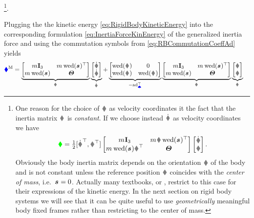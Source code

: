 \footnote{
One reason for the choice of $\v$ as velocity coordinates it the fact that the inertia matrix $\bodyInertiaMat{}{}$ is \textit{constant}.
If we choose instead $\rd$ as velocity coordinates we have
\begin{align*}
 \kineticEnergy = \tfrac{1}{2} [\rd^\top, \w^\top] \begin{bmatrix} \bodyMass{}{} \idMat[3] & \bodyMass{}{} \R \wedOp(\bodyCOM{}{})^\top \\ \bodyMass{}{} \wedOp(\bodyCOM{}{}) \R^\top & \bodyMOI{}{} \end{bmatrix} \begin{bmatrix} \rd \\ \w \end{bmatrix}.
\end{align*}
Obviously the body inertia matrix depends on the orientation $\R$ of the body and is not constant unless the reference position $\r$ coincides with the \textit{center of mass}, i.e.\ $\bodyCOM{}{}{} = 0$.
Actually many textbooks, \eg \cite[p.\,167]{Murray:Robotic} or \cite[p.\,153]{Shabana:MultibodySystems}, restrict to this case for their expressions of the kinetic energy.
In the next section on rigid body systems we will see that it can be quite useful to use \textit{geometrically} meaningful body fixed frames rather than restricting to the center of mass.
}.

Plugging the the kinetic energy \eqref{eq:RigidBodyKineticEnergy} into the corresponding formulation \eqref{eq:InertiaForceKinEnergy} of the generalized inertia force and using the commutation symbols from \eqref{eq:RBCommutationCoeffAd} yields
\begin{align}\label{eq:InertiaForceRB}
 \genForceInertia &=
 \underbrace{\begin{bmatrix} \bodyMass{}{}\idMat[3] & \bodyMass{}{} \wedOp(\bodyCOM{}{})^\top \\ \bodyMass{}{} \wedOp(\bodyCOM{}{}) & \bodyMOI{}{} \end{bmatrix}}_{\bodyInertiaMat{}{}}
 \underbrace{\begin{bmatrix} \vd \\ \dot{\w} \end{bmatrix}}_{\bodyVeld{}{}}
 +
 \underbrace{\begin{bmatrix} \wedOp(\bodyAngVel{}{}) & 0 \\ \wedOp(\bodyLinVel{}{}) & \wedOp(\bodyAngVel{}{}) \end{bmatrix}}_{-\ad{\sysVel}^\top}
 \underbrace{\begin{bmatrix} \bodyMass{}{}\idMat[3] & \bodyMass{}{} \wedOp(\bodyCOM{}{})^\top \\ \bodyMass{}{} \wedOp(\bodyCOM{}{}) & \bodyMOI{}{} \end{bmatrix}}_{\bodyInertiaMat{}{}}
 \underbrace{\begin{bmatrix} \v \\ \w \end{bmatrix}}_{\bodyVel{}{}}
\end{align}

